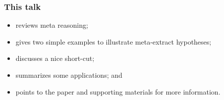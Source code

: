 \begin{frame}[fragile]
\frametitle{This talk}
  \begin{itemize}

  \item reviews meta reasoning;

  \item gives two simple examples to illustrate meta-extract hypotheses;

  \item discusses a nice short-cut;

  \item summarizes some applications; and

  \item points to the paper and supporting materials for more information.

  \end{itemize}

\end{frame}
